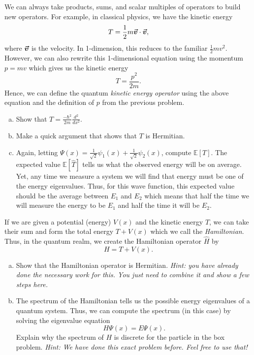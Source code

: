 \documentclass[12pt]{article} %
\begin{document}
\begin{problem}
	We can always take products, sums, and scalar multiples of operators to build new operators.  For example, in classical physics, we have the kinetic energy
	\[
	T=\frac{1}{2}m \boldsymbol{\vec{v}} \cdot \boldsymbol{\vec{v}},
	\]
	where $\boldsymbol{\vec{v}}$ is the velocity. In 1-dimension, this reduces to the familiar $\frac{1}{2}mv^2$.  However, we can also rewrite this 1-dimensional equation using the momentum $p=mv$ which gives us the kinetic energy
	\[
	T=\frac{p^2}{2m}.
	\]
	Hence, we can define the quantum \emph{kinetic energy operator} using the above equation and the definition of $p$ from the previous problem.
	\begin{enumerate}[(a)]
		\item Show that $T = \frac{-\hbar^2}{2m}\frac{d^2}{dx^2}$.
		\item Make a quick argument that shows that $T$ is Hermitian.
		\item Again, letting $\Psi(x)=\frac{1}{\sqrt{2}}\psi_1(x)+\frac{1}{\sqrt{2}}\psi_2(x)$, compute $\mathbb{E}[T]$. The expected value $\mathbb{E}[\hat{T}]$ tells us what the observed energy will be on average. Yet, any time we measure a system we will find that energy must be one of the energy eigenvalues. Thus, for this wave function, this expected value should be the average between $E_1$ and $E_2$ which means that half the time we will measure the energy to be $E_1$ and half the time it will be $E_2$.
	\end{enumerate}	
\end{problem}

\begin{problem}
If we are given a potential (energy) $V(x)$ and the kinetic energy $T$, we can take their sum and form the total energy $T+V(x)$ which we call the \emph{Hamiltonian}.  Thus, in the quantum realm, we create the Hamiltonian operator $\hat{H}$ by
\[
H=T+V(x).
\]
\begin{enumerate}[(a)]
	\item Show that the Hamiltonian operator is Hermitian. \emph{Hint: you have already done the necessary work for this. You just need to combine it and show a few steps here.}
	\item The spectrum of the Hamiltonian tells us the possible energy eigenvalues of a quantum system. Thus, we can compute the spectrum (in this case) by solving the eigenvalue equation
	\[
	H\Psi(x)=E\Psi(x).
	\]
	Explain why the spectrum of $H$ is discrete for the particle in the box problem. \emph{Hint: We have done this exact problem before. Feel free to use that!}
\end{enumerate}
\end{problem}
\end{document}
